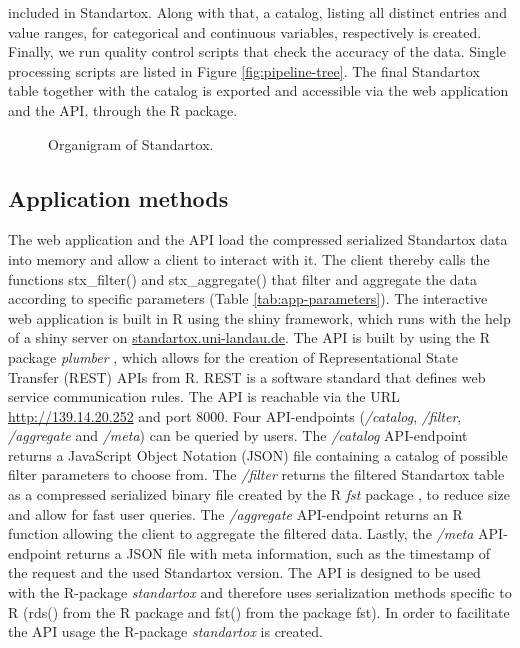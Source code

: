 included in Standartox. Along with that, a catalog, listing all distinct entries and value ranges, for categorical and continuous variables, respectively is created. Finally, we run quality control scripts that check the accuracy of the data. Single processing scripts are listed in Figure \ref{fig:pipeline-tree}. The final Standartox table together with the catalog is exported and accessible via the web application and the API, through the R package.



\begin{figure}
    
    \caption{Organigram of Standartox.}
    \label{fig:stx-organigram}
\end{figure}

\subsection{Application methods}
The web application and the API load the compressed serialized Standartox data into memory and allow a client to interact with it. The client thereby calls the functions stx\_filter() and stx\_aggregate() that filter and aggregate the data according to specific parameters (Table \ref{tab:app-parameters}). The interactive web application is built in R using the shiny framework, which runs with the help of a shiny server \citep{chang_shiny_2018} on \url{standartox.uni-landau.de}. The API is built by using the R package \textit{plumber} \citep{trestletechnologyllc_plumber_2018}, which allows for the creation of Representational State Transfer (REST) APIs from R. REST is a software standard that defines web service communication rules. The API is reachable via the URL \url{http://139.14.20.252} and port 8000. Four API-endpoints (\textit{/catalog}, \textit{/filter}, \textit{/aggregate} and \textit{/meta}) can be queried by users. The \textit{/catalog} API-endpoint returns a JavaScript Object Notation (JSON) file containing a catalog of possible filter parameters to choose from. The \textit{/filter} returns the filtered Standartox table as a compressed serialized binary file created by the R \textit{fst} package \citep{klik_fst_2019}, to reduce size and allow for fast user queries. The \textit{/aggregate} API-endpoint returns an R function allowing the client to aggregate the filtered data. Lastly, the \textit{/meta} API-endpoint returns a JSON file with meta information, such as the timestamp of the request and the used Standartox version. The API is designed to be used with the R-package \textit{standartox} and therefore uses serialization methods specific to R (rds() from the R package  and fst() from the package fst). In order to facilitate the API usage the R-package \textit{standartox} is created.

